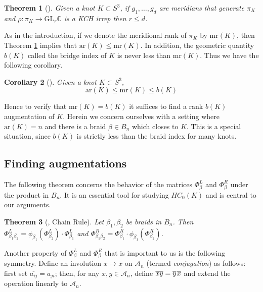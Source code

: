 \documentclass[11pt]{amsart}
\def\C{{\mathbb C}}
\def\A{{\mathcal A}}
\newtheorem{thm}{Theorem}[section]
\newtheorem{cor}[thm]{Corollary}
\theoremstyle{definition}
\begin{document}
  \begin{thm}[\cite{Cor13b}] Given a knot $K\subset S^3$, if $g_1,\ldots,g_d$ are meridians that generate $\pi_K$ and $\rho:\pi_K\to\text{GL}_r\C$ is a KCH irrep then $r\le d$.
  \label{thm:DimBound}
  \end{thm}

  As in the introduction, if we denote the meridional rank of $\pi_K$ by $\text{mr}(K)$, then Theorem \ref{thm:DimBound} implies that $\text{ar}(K)\le\text{mr}(K)$. In addition, the geometric quantity $b(K)$ called the bridge index of $K$ is never less than $\text{mr}(K)$. Thus we have the following corollary.
    
\begin{cor}[\cite{Cor13b}] Given a knot $K\subset S^3$,
$$\text{ar}(K)\le\text{mr}(K)\le b(K)$$
\label{cor:DimBound}
\end{cor}

  Hence to verify that $\text{mr}(K)=b(K)$ it suffices to find a rank $b(K)$ augmentation of $K$. Herein we concern ourselves with a setting where $\text{ar}(K)=n$ and there is a braid $\beta\in B_n$ which closes to $K$. This is a special situation, since $b(K)$ is strictly less than the braid index for many knots.

\subsection{Finding augmentations}
\label{SecBG_AugExist}
  The following theorem concerns the behavior of the matrices $\Phi_\beta^L$ and $\Phi_\beta^R$ under the product in $B_n$. It is an essential tool for studying $HC_0(K)$ and is central to our arguments.

  \begin{thm}[\cite{Ng05}, Chain Rule] Let $\beta_1,\beta_2$ be braids in $B_n$. Then $\Phi_{\beta_1\beta_2}^L = \phi_{\beta_1}(\Phi_{\beta_2}^L)\cdot\Phi_{\beta_1}^L$ and $\Phi_{\beta_1\beta_2}^R = \Phi_{\beta_1}^R\cdot\phi_{\beta_1}(\Phi_{\beta_2}^R)$.
  \label{thm:ChainRule}
  \end{thm}

  Another property of $\Phi_\beta^L$ and $\Phi_\beta^R$ that is important to us is the following symmetry. Define an involution $x\mapsto\overline x$ on $\A_n$ (termed \emph{conjugation}) as follows: first set $\overline{a_{ij}}=a_{ji}$; then, for any $x,y\in\A_n$, define $\overline{xy}=\overline y\hspace*{1pt}\overline x$ and extend the operation linearly to $\A_n$.
\end{document}
